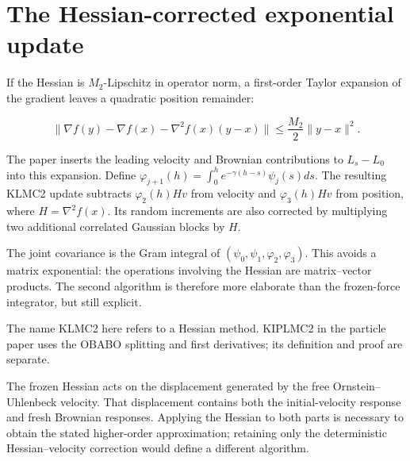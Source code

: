 \documentclass[11pt,a4paper]{article}
\begin{document}
\section{\texorpdfstring{The Hessian-corrected exponential update}{The Hessian-corrected exponential update}}


If the Hessian is \(M_2\)-Lipschitz in operator norm, a first-order
Taylor expansion of the gradient leaves a quadratic position remainder:


\[\|\nabla f(y)-\nabla f(x)-\nabla^2f(x)(y-x)\|
\le\frac{M_2}{2}\|y-x\|^2.\]


The paper inserts the leading velocity and Brownian contributions to
\(L_s-L_0\) into this expansion. Define
\(\varphi_{j+1}(h)=\int_0^he^{-\gamma(h-s)}\psi_j(s)ds\). The resulting
KLMC2 update subtracts \(\varphi_2(h)H v\) from velocity and
\(\varphi_3(h)H v\) from position, where \(H=\nabla^2f(x)\). Its random
increments are also corrected by multiplying two additional correlated
Gaussian blocks by \(H\).




The joint covariance is the Gram integral of
\((\psi_0,\psi_1,\varphi_2,\varphi_3)\). This avoids a matrix exponential:
the operations involving the Hessian are matrix–vector products. The second
algorithm is therefore more elaborate than the frozen-force integrator, but
still explicit.




The name KLMC2 here refers to a Hessian method. KIPLMC2 in the particle
paper uses the OBABO splitting and first derivatives; its definition and proof
are separate.



The frozen Hessian acts on the displacement generated by the free Ornstein–Uhlenbeck velocity. That displacement contains both the initial-velocity response and fresh Brownian responses. Applying the Hessian to both parts is necessary to obtain the stated higher-order approximation; retaining only the deterministic Hessian–velocity correction would define a different algorithm.
\end{document}
